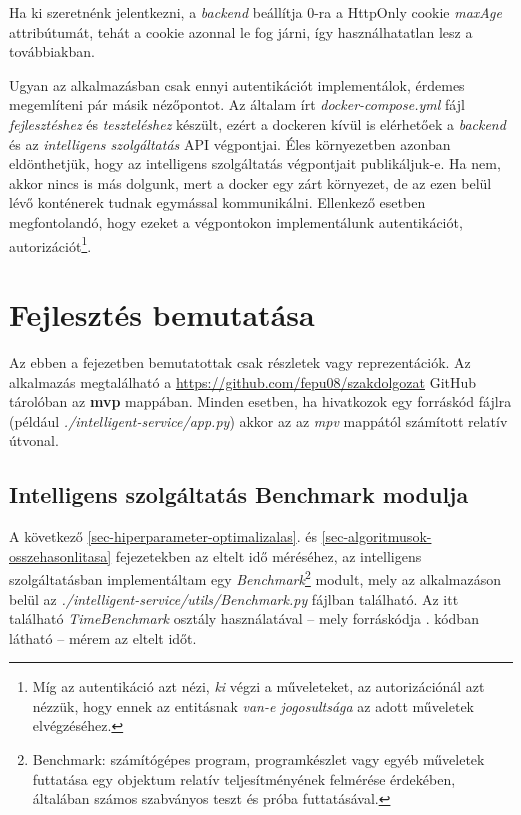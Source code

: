 \documentclass[
]{thesis-ekf}
\theoremstyle{definition}
\theoremstyle{remark}
\begin{document}
Ha ki szeretnénk jelentkezni, a \emph{backend} beállítja 0-ra a HttpOnly cookie \emph{maxAge} attribútumát, tehát a cookie azonnal le fog járni, így használhatatlan lesz a továbbiakban.

Ugyan az alkalmazásban csak ennyi autentikációt implementálok, érdemes megemlíteni pár másik nézőpontot. Az általam írt \emph{docker-compose.yml} fájl  \emph{fejlesztéshez} és \emph{teszteléshez} készült, ezért a dockeren kívül is elérhetőek a \emph{backend} és az \emph{intelligens szolgáltatás} API végpontjai. Éles környezetben azonban eldönthetjük, hogy az intelligens szolgáltatás végpontjait publikáljuk-e. Ha nem, akkor nincs is más dolgunk, mert a docker egy zárt környezet, de az ezen belül lévő konténerek tudnak egymással kommunikálni. Ellenkező esetben megfontolandó, hogy ezeket a végpontokon implementálunk autentikációt, autorizációt\footnote{Míg az autentikáció azt nézi, \emph{ki} végzi a műveleteket, az autorizációnál azt nézzük, hogy ennek az entitásnak \emph{van-e jogosultsága} az adott műveletek elvégzéséhez.}.


\chapter{Fejlesztés bemutatása}
Az ebben a fejezetben bemutatottak csak részletek vagy reprezentációk. Az alkalmazás megtalálható a \url{https://github.com/fepu08/szakdolgozat} GitHub tárolóban az \textbf{mvp} mappában. Minden esetben, ha hivatkozok egy forráskód fájlra (például \emph{./intelligent-service/app.py}) akkor az az \emph{mpv} mappától számított relatív útvonal.

\section{Intelligens szolgáltatás Benchmark modulja}
\label{sec-benchmark-modul}
A következő \ref{sec-hiperparameter-optimalizalas}. és \ref{sec-algoritmusok-osszehasonlitasa} fejezetekben az eltelt idő méréséhez, az intelligens szolgáltatásban implementáltam egy \emph{Benchmark}\footnote{Benchmark: számítógépes program, programkészlet vagy egyéb műveletek futtatása egy objektum relatív teljesítményének felmérése érdekében, általában számos szabványos teszt és próba futtatásával.\cite{wiki-benchmark}} modult, mely az alkalmazáson belül az \emph{./intelligent-service/utils/Benchmark.py} fájlban található. Az itt található \emph{TimeBenchmark} osztály használatával -- mely forráskódja . kódban látható -- mérem az eltelt időt.
\end{document}
